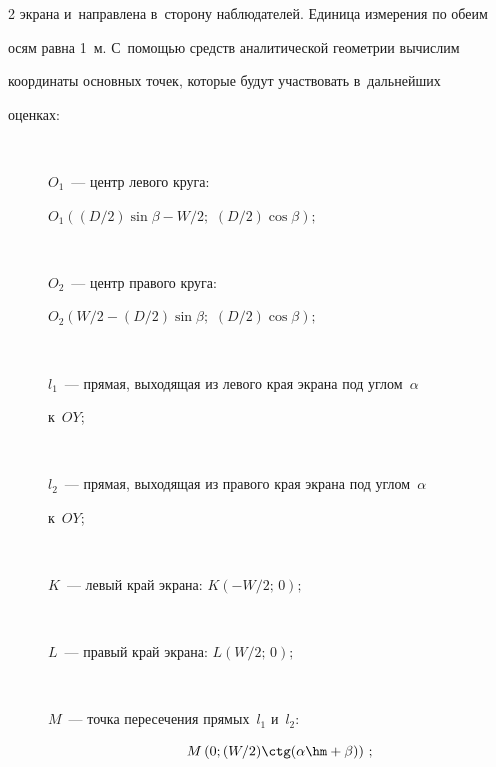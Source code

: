\begin{multicols}{2}
экрана и~направлена в~сторону наблюдателей. Единица измерения по обеим

осям равна 1~м. С~по\-мощью средств аналитической геометрии вы\-чис\-лим

координаты основных точек, которые будут участвовать в~дальнейших

оценках:

\begin{description}

\item[\,]     $O_1$~--- центр левого круга:

     $

     O_1\left( ({D}/{2})\sin\beta - W/2;\right.$ $\left.\left(D/2\right)\cos\beta\right);

     $

\item[\,]

      $O_2$~--- центр правого круга:

     $O_2\left( {W}/{2}-({D}/{2})\sin\beta;\right.$ $\left.({D}/{2})\cos\beta\right);$



\item[\,] $l_1$~--- прямая, выходящая из левого края экрана под углом~$\alpha$

к~$OY$;

\item[\,]

$l_2$~--- прямая, выходящая из правого края экрана под углом~$\alpha$

к~$OY$;

\item[\,]

$K$~--- левый край экрана: $K\left( -{W}/{2};\,0\right);$

\item[\,]

$L$~--- правый край экрана: $L\left( {W}/{2};\,0\right);$

\item[\,]

$M$~--- точка пересечения прямых~$l_1$ и~$l_2$:



\noindent

$$

M\left( 0;({W}/{2})\ctg(\alpha\hm+\beta)\right)\,;

$$



\vspace*{-4pt}


\end{description}
\end{multicols}
